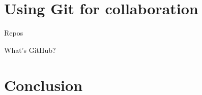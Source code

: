 \documentclass{beamer}
\begin{document}
\section{Using Git for collaboration}

\begin{frame}{Repos}
\end{frame}

\begin{frame}{What's GitHub?}
\end{frame}

\section*{Conclusion}
\end{document}
